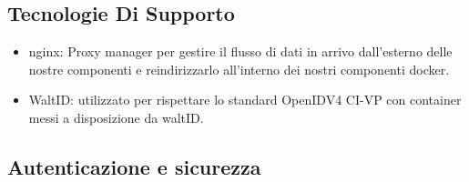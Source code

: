 \subsection{Tecnologie Di Supporto}
\begin{itemize}
    \item nginx: Proxy manager per gestire il flusso di dati in arrivo dall'esterno delle nostre componenti e reindirizzarlo all'interno dei nostri componenti docker.
    \item WaltID: utilizzato per rispettare lo standard OpenIDV4 CI-VP con container messi a disposizione da waltID.
\end{itemize}

\subsection{Autenticazione e sicurezza}